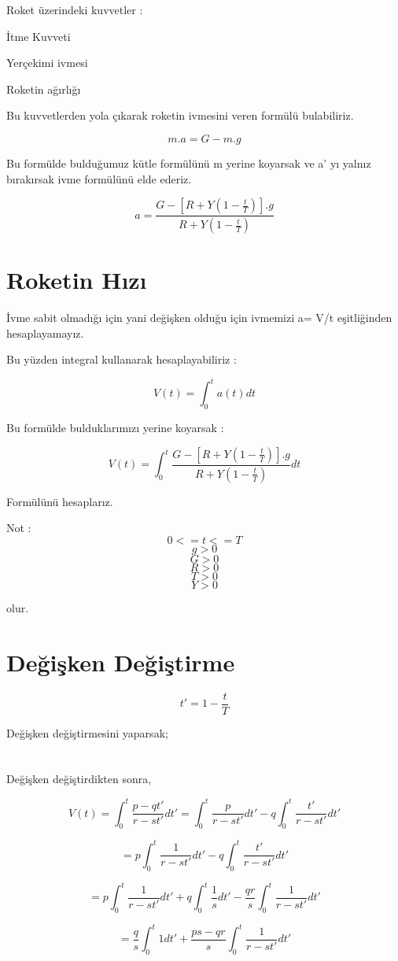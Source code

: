 \documentclass[a4paper,10pt]{article}
\begin{document}
Roket üzerindeki kuvvetler : 

İtme Kuvveti 

Yerçekimi ivmesi 

Roketin ağırlığı

Bu kuvvetlerden yola çıkarak roketin ivmesini veren formülü bulabiliriz.

\[
 m.a = G - m.g
\]


Bu formülde bulduğumuz kütle formülünü m yerine koyarsak ve a' yı yalnız bırakırsak ivme formülünü elde ederiz.


\[
a = \frac {G - [ R + Y ( 1 - \frac{t}{T} ) ].g }{R + Y ( 1 - \frac{t}{T})}
\]


\section{Roketin Hızı}

İvme sabit olmadığı için yani değişken olduğu için ivmemizi        a= V/t eşitliğinden hesaplayamayız.


Bu yüzden integral kullanarak hesaplayabiliriz :

\[
 V(t) = \int_0^t a(t)dt 
\]

Bu formülde bulduklarımızı yerine koyarsak :

\[
 V(t) = \int_0^t\frac{G - [R + Y (1 - \frac{t}{T})].g}{R + Y (1 - \frac{t}{T} )}dt
\]


Formülünü hesaplarız.

Not :\[
      0 <= t <= T  
     \]
     \[
      g > 0 
     \]
     \[
      G > 0 
     \]
     \[
      R > 0 
     \]
     \[
      T > 0 
     \]
     \[
      Y > 0
     \]



   olur.

\section{Değişken Değiştirme}

 \[
  t' = 1 - \frac{t}{T}
 \]
 
    Değişken değiştirmesini yaparsak;
    
\section{}

Değişken değiştirdikten sonra,

\[
 V(t) = \int_0^t\frac{p-qt'}{r-st'} dt' = \int_0^t\frac{p}{r-st'} dt' - q \int_0^t\frac{t'}{r-st'} dt'
\]

\[ 
 = p\int_0^t\frac{1}{r-st'} dt' - q \int_0^t\frac{t'}{r-st'}dt'
\]

\[ 
 = p\int_0^t\frac{1}{r-st'} dt' +q \int_0^t\frac{1}{s} dt' -\frac{qr}{s}\int_0^t\frac{1}{r-st'} dt'
\]

\[
 = \frac{q}{s}\int_0^t{1}dt' + \frac{ps-qr}{s}\int_0^t\frac{1}{r-st'} dt'
\]
\end{document}
